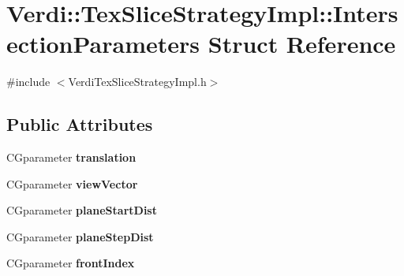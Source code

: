 \hypertarget{struct_verdi_1_1_tex_slice_strategy_impl_1_1_intersection_parameters}{\section{\-Verdi\-:\-:\-Tex\-Slice\-Strategy\-Impl\-:\-:\-Intersection\-Parameters \-Struct \-Reference}
\label{struct_verdi_1_1_tex_slice_strategy_impl_1_1_intersection_parameters}
}


{\ttfamily \#include $<$\-Verdi\-Tex\-Slice\-Strategy\-Impl.\-h$>$}

\subsection*{\-Public \-Attributes}
\begin{DoxyCompactItemize}
\item 
\hypertarget{struct_verdi_1_1_tex_slice_strategy_impl_1_1_intersection_parameters_a4636448c494d7cb0cdd94ac453e394c3}{\-C\-Gparameter {\bfseries translation}}\label{struct_verdi_1_1_tex_slice_strategy_impl_1_1_intersection_parameters_a4636448c494d7cb0cdd94ac453e394c3}

\item 
\hypertarget{struct_verdi_1_1_tex_slice_strategy_impl_1_1_intersection_parameters_aa22258fbfd6c449dcf2bf895dd911b44}{\-C\-Gparameter {\bfseries view\-Vector}}\label{struct_verdi_1_1_tex_slice_strategy_impl_1_1_intersection_parameters_aa22258fbfd6c449dcf2bf895dd911b44}

\item 
\hypertarget{struct_verdi_1_1_tex_slice_strategy_impl_1_1_intersection_parameters_a54219861a36ca5be940ff641d6f30461}{\-C\-Gparameter {\bfseries plane\-Start\-Dist}}\label{struct_verdi_1_1_tex_slice_strategy_impl_1_1_intersection_parameters_a54219861a36ca5be940ff641d6f30461}

\item 
\hypertarget{struct_verdi_1_1_tex_slice_strategy_impl_1_1_intersection_parameters_a564ebf241ce4faa9fe081fe8619efa15}{\-C\-Gparameter {\bfseries plane\-Step\-Dist}}\label{struct_verdi_1_1_tex_slice_strategy_impl_1_1_intersection_parameters_a564ebf241ce4faa9fe081fe8619efa15}

\item 
\hypertarget{struct_verdi_1_1_tex_slice_strategy_impl_1_1_intersection_parameters_ab90f9ff38e6021b288dee05cdc34f8c4}{\-C\-Gparameter {\bfseries front\-Index}}\label{struct_verdi_1_1_tex_slice_strategy_impl_1_1_intersection_parameters_ab90f9ff38e6021b288dee05cdc34f8c4}

\end{DoxyCompactItemize}


